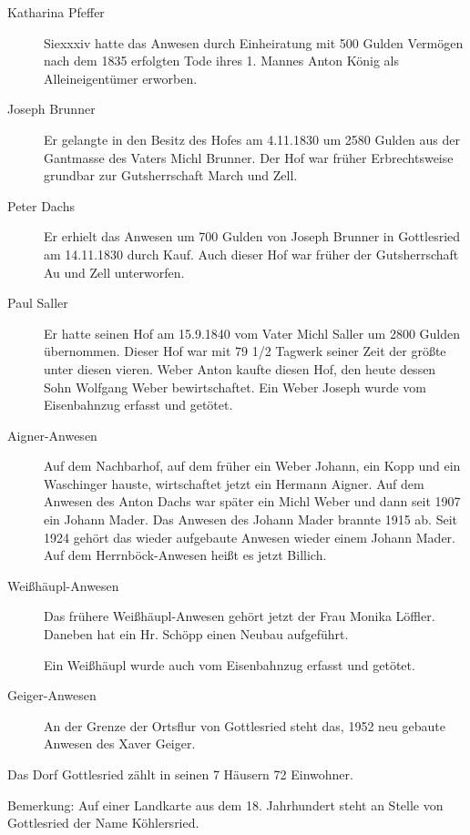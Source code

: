 \documentclass{book}
\begin{document}
\begin{description}
\item[Katharina Pfeffer] Siexxxiv hatte das Anwesen durch Einheiratung mit 500
Gulden Vermögen nach dem 1835 erfolgten Tode ihres 1. Mannes Anton König als
Alleineigentümer erworben.

\item[Joseph Brunner] Er gelangte in den Besitz des Hofes am 4.11.1830 um 2580
Gulden aus der Gantmasse des Vaters Michl Brunner. Der Hof war früher
Erbrechtsweise grundbar zur Gutsherrschaft March und Zell.

\item[Peter Dachs] Er erhielt das Anwesen um 700 Gulden von Joseph Brunner in
Gottlesried am 14.11.1830 durch Kauf. Auch dieser Hof war früher der
Gutsherrschaft Au und Zell unterworfen.

\item[Paul Saller] Er hatte seinen Hof am 15.9.1840 vom Vater Michl Saller um
2800 Gulden übernommen. Dieser Hof war mit 79 1/2 Tagwerk seiner Zeit der größte
unter diesen vieren. Weber Anton kaufte diesen Hof, den heute dessen Sohn
Wolfgang Weber bewirtschaftet. Ein Weber Joseph wurde vom Eisenbahnzug erfasst
und getötet.

\item[Aigner-Anwesen] Auf dem Nachbarhof, auf dem früher ein Weber Johann, ein
Kopp und ein Waschinger hauste, wirtschaftet jetzt ein Hermann Aigner. Auf dem
Anwesen des Anton Dachs war später ein Michl Weber und dann seit 1907 ein Johann
Mader. Das Anwesen des Johann Mader brannte 1915 ab. Seit 1924 gehört das wieder
aufgebaute Anwesen wieder einem Johann Mader. Auf dem Herrnböck-Anwesen heißt es
jetzt Billich.

\item[Weißhäupl-Anwesen] Das frühere Weißhäupl-Anwesen gehört jetzt der Frau
Monika Löffler. Daneben hat ein Hr. Schöpp einen Neubau aufgeführt.

Ein Weißhäupl wurde auch vom Eisenbahnzug erfasst und getötet.

\item[Geiger-Anwesen] An der Grenze der Ortsflur von Gottlesried steht das,
1952 neu gebaute Anwesen des Xaver Geiger.
\end{description}

Das Dorf Gottlesried zählt in seinen 7 Häusern 72 Einwohner.

Bemerkung: Auf einer Landkarte aus dem 18. Jahrhundert steht an Stelle von
Gottlesried der Name Köhlersried.
\end{document}
